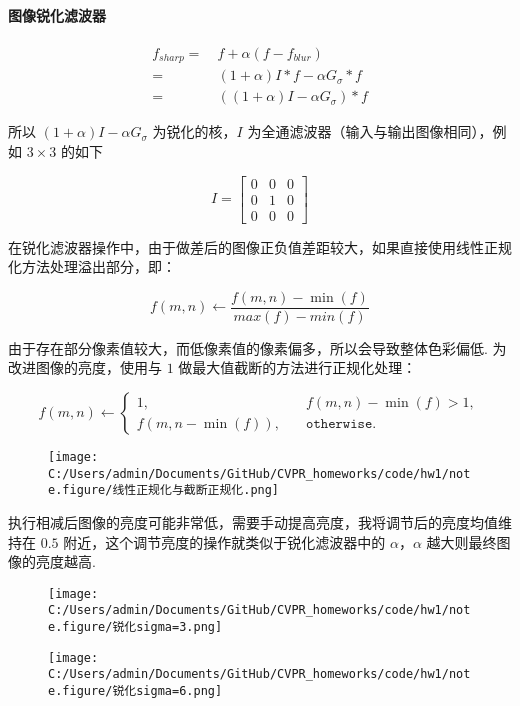 \documentclass[
]{article}
\begin{document}
\hypertarget{ux56feux50cfux9510ux5316ux6ee4ux6ce2ux5668}{%
\paragraph{图像锐化滤波器}\label{ux56feux50cfux9510ux5316ux6ee4ux6ce2ux5668}}

\begin{align*}
f_{sharp} =&\ f+\alpha(f-f_{blur})\\
=&\ (1+\alpha)I*f-\alpha G_{\sigma}*f\\
=&\ ((1+\alpha)I-\alpha G_\sigma)*f
\end{align*}

所以 \((1+\alpha)I-\alpha G_\sigma\) 为锐化的核，\(I\)
为全通滤波器（输入与输出图像相同），例如 \(3\times 3\) 的如下

\[I = \left[\begin{matrix}0&0&0\\0&1&0\\0&0&0\end{matrix}\right]\]

在锐化滤波器操作中，由于做差后的图像正负值差距较大，如果直接使用线性正规化方法处理溢出部分，即：

\[f(m,n)\leftarrow \frac{f(m,n)-\min(f)}{max(f)-min(f)}\]

由于存在部分像素值较大，而低像素值的像素偏多，所以会导致整体色彩偏低.
为改进图像的亮度，使用与 \(1\) 做最大值截断的方法进行正规化处理：

\[f(m,n)\leftarrow \begin{cases}
1,& \quad f(m,n)-\min(f)>1,\\
f(m,n-\min(f)),& \quad\texttt{otherwise}.
\end{cases}\]

\begin{figure}
\centering
\texttt{[image: C:/Users/admin/Documents/GitHub/CVPR\_homeworks/code/hw1/note.figure/线性正规化与截断正规化.png]}
\caption{}
\end{figure}

执行相减后图像的亮度可能非常低，需要手动提高亮度，我将调节后的亮度均值维持在
\(0.5\) 附近，这个调节亮度的操作就类似于锐化滤波器中的
\(\alpha\)，\(\alpha\) 越大则最终图像的亮度越高.

\begin{figure}
\centering
\texttt{[image: C:/Users/admin/Documents/GitHub/CVPR\_homeworks/code/hw1/note.figure/锐化sigma=3.png]}
\caption{}
\end{figure}

\begin{figure}
\centering
\texttt{[image: C:/Users/admin/Documents/GitHub/CVPR\_homeworks/code/hw1/note.figure/锐化sigma=6.png]}
\caption{}
\end{figure}
\end{document}
